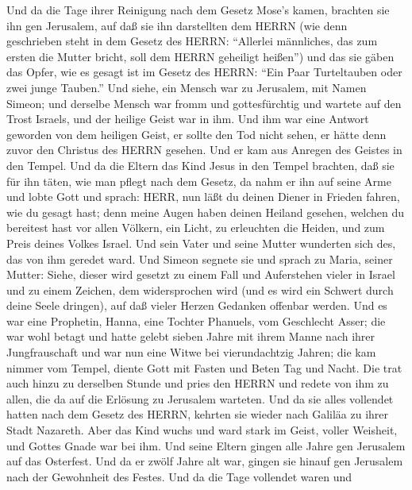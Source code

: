 Und da die Tage ihrer Reinigung nach dem Gesetz Mose's kamen, brachten
sie ihn gen Jerusalem, auf daß sie ihn darstellten dem HERRN
 (wie denn geschrieben steht in dem Gesetz des HERRN:
``Allerlei männliches, das zum ersten die Mutter bricht, soll dem HERRN
geheiligt heißen'')  und das sie gäben das Opfer, wie es
gesagt ist im Gesetz des HERRN: ``Ein Paar Turteltauben oder zwei junge
Tauben.''  Und siehe, ein Mensch war zu Jerusalem, mit
Namen Simeon; und derselbe Mensch war fromm und gottesfürchtig und
wartete auf den Trost Israels, und der heilige Geist war in ihm.
 Und ihm war eine Antwort geworden von dem heiligen Geist,
er sollte den Tod nicht sehen, er hätte denn zuvor den Christus des
HERRN gesehen.  Und er kam aus Anregen des Geistes in den
Tempel. Und da die Eltern das Kind Jesus in den Tempel brachten, daß sie
für ihn täten, wie man pflegt nach dem Gesetz,  da nahm er
ihn auf seine Arme und lobte Gott und sprach:  HERR, nun
läßt du deinen Diener in Frieden fahren, wie du gesagt hast;
 denn meine Augen haben deinen Heiland gesehen,
 welchen du bereitest hast vor allen Völkern, 
ein Licht, zu erleuchten die Heiden, und zum Preis deines Volkes Israel.
 Und sein Vater und seine Mutter wunderten sich des, das
von ihm geredet ward.  Und Simeon segnete sie und sprach zu
Maria, seiner Mutter: Siehe, dieser wird gesetzt zu einem Fall und
Auferstehen vieler in Israel und zu einem Zeichen, dem widersprochen
wird  (und es wird ein Schwert durch deine Seele dringen),
auf daß vieler Herzen Gedanken offenbar werden.  Und es war
eine Prophetin, Hanna, eine Tochter Phanuels, vom Geschlecht Asser; die
war wohl betagt und hatte gelebt sieben Jahre mit ihrem Manne nach ihrer
Jungfrauschaft  und war nun eine Witwe bei vierundachtzig
Jahren; die kam nimmer vom Tempel, diente Gott mit Fasten und Beten Tag
und Nacht.  Die trat auch hinzu zu derselben Stunde und
pries den HERRN und redete von ihm zu allen, die da auf die Erlösung zu
Jerusalem warteten.  Und da sie alles vollendet hatten nach
dem Gesetz des HERRN, kehrten sie wieder nach Galiläa zu ihrer Stadt
Nazareth.  Aber das Kind wuchs und ward stark im Geist,
voller Weisheit, und Gottes Gnade war bei ihm.  Und seine
Eltern gingen alle Jahre gen Jerusalem auf das Osterfest. 
Und da er zwölf Jahre alt war, gingen sie hinauf gen Jerusalem nach der
Gewohnheit des Festes.  Und da die Tage vollendet waren und
